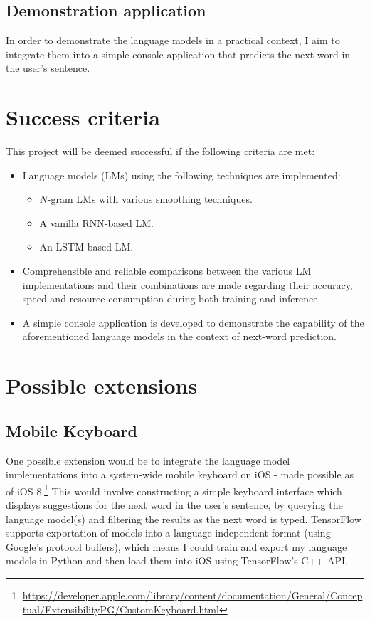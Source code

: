 \documentclass[a4paper, 12pt]{article}
\newcommand{\hlink}[2]{{\href{#1}{#2}}}
\begin{document}
\subsection*{Demonstration application}
In order to demonstrate the language models in a practical context, I aim to integrate them into a simple console application that predicts the next word in the user's sentence.

\section*{Success criteria}

This project will be deemed successful if the following criteria are met:

\begin{itemize}
\item
	Language models (LMs) using the following techniques are implemented:
	\begin{itemize}
	\item
		$N$-gram LMs with various smoothing techniques.
	\item
		A vanilla RNN-based LM.
	\item
		An LSTM-based LM.
	\end{itemize}
\item
	Comprehensible and reliable comparisons between the various LM implementations and their combinations are made regarding their accuracy, speed and resource consumption during both training and inference.
\item
	A simple console application is developed to demonstrate the capability of the aforementioned language models in the context of next-word prediction.
\end{itemize}

\section*{Possible extensions}

\subsection*{Mobile Keyboard}
One possible extension would be to integrate the language model implementations into a system-wide mobile keyboard on iOS - made possible as of iOS 8.\footnote{\scriptsize{\hlink{https://developer.apple.com/library/content/documentation/General/Conceptual/ExtensibilityPG/CustomKeyboard.html}{https://developer.apple.com/library/content/documentation/General/Conceptual/ExtensibilityPG/CustomKeyboard.html}}} This would involve constructing a simple keyboard interface which displays suggestions for the next word in the user's sentence, by querying the language model(s) and filtering the results as the next word is typed. TensorFlow supports exportation of models into a language-independent format (using Google's protocol buffers), which means I could train and export my language models in Python and then load them into iOS using TensorFlow's C++ API.
\end{document}
